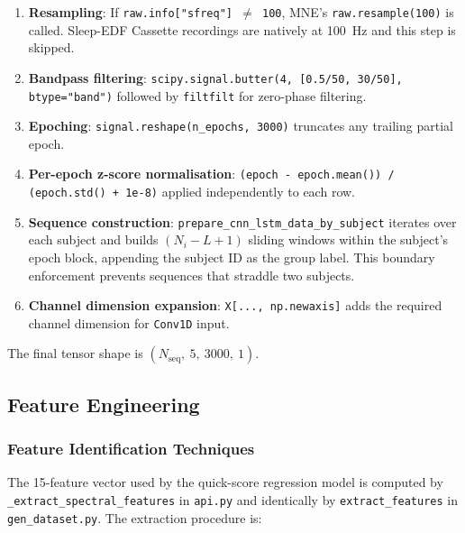 \documentclass[10pt]{article}
\begin{document}
\begin{enumerate}
  \item \textbf{Resampling}: If \texttt{raw.info["sfreq"] $\neq$ 100}, MNE's \texttt{raw.resample(100)} is called. Sleep-EDF Cassette recordings are natively at 100~Hz and this step is skipped.
  \item \textbf{Bandpass filtering}: \texttt{scipy.signal.butter(4, [0.5/50, 30/50], btype="band")} followed by \texttt{filtfilt} for zero-phase filtering.
  \item \textbf{Epoching}: \texttt{signal.reshape(n\_epochs, 3000)} truncates any trailing partial epoch.
  \item \textbf{Per-epoch z-score normalisation}: \texttt{(epoch - epoch.mean()) / (epoch.std() + 1e-8)} applied independently to each row.
  \item \textbf{Sequence construction}: \texttt{prepare\_cnn\_lstm\_data\_by\_subject} iterates over each subject and builds $(N_i - L + 1)$ sliding windows within the subject's epoch block, appending the subject ID as the group label. This boundary enforcement prevents sequences that straddle two subjects.
  \item \textbf{Channel dimension expansion}: \texttt{X[..., np.newaxis]} adds the required channel dimension for \texttt{Conv1D} input.
\end{enumerate}

The final tensor shape is $(N_{\text{seq}},\ 5,\ 3000,\ 1)$.

\subsection{Feature Engineering}
\label{sec:featureEngineering}

\subsubsection{Feature Identification Techniques}
\label{sec:featureIdentification}

The 15-feature vector used by the quick-score regression model is computed by \texttt{\_extract\_spectral\_features} in \texttt{api.py} and identically by \texttt{extract\_features} in \texttt{gen\_dataset.py}. The extraction procedure is:
\end{document}
